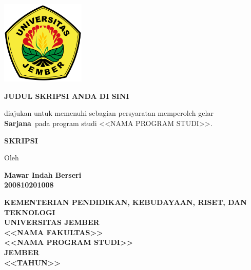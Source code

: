 \documentclass[12pt, a4paper, onecolumn, oneside]{report}
\newcommand{\thetitle}{JUDUL SKRIPSI ANDA DI SINI} %
\newcommand{\theauthor}{Mawar Indah Berseri} %
\newcommand{\thenim}{200810201008} %
\newcommand{\thedegree}{\textbf{Sarjana}} %
\newcommand{\thestudyprogram}{\textless\textless NAMA PROGRAM STUDI\textgreater\textgreater} %
\newcommand{\thetypeofreport}{SKRIPSI} %
\newcommand{\thefaculty}{\textless\textless NAMA FAKULTAS\textgreater\textgreater} %
\newcommand{\theyear}{\textless\textless TAHUN\textgreater\textgreater} %
\begin{document}
\begin{titlepage}
    \centering
    \vspace*{2cm} %

    \includegraphics[width=0.3\textwidth]{resources/images/logo_unej.png}\par %
    \vspace{1cm}

    {\bfseries\fontsize{14pt}{16pt}\selectfont \MakeUppercase{\thetitle}} %
    \vspace{1.5cm}

    diajukan untuk memenuhi sebagian persyaratan memperoleh gelar \\\thedegree\ pada program studi \thestudyprogram. %
    \vspace{1cm}

    \textbf{\MakeUppercase{\thetypeofreport}} %
    \vspace{1.5cm}

    Oleh \par %
    \vspace{0.5cm}

    \textbf{\theauthor} \\ %
    \textbf{\thenim} \par %
    \vspace{2cm} %

    \textbf{KEMENTERIAN PENDIDIKAN, KEBUDAYAAN, RISET, DAN TEKNOLOGI} \\
    \textbf{UNIVERSITAS JEMBER} \\
    \textbf{\MakeUppercase{\thefaculty}} \\ 
    \textbf{\MakeUppercase{\thestudyprogram}} \\ 
    \textbf{JEMBER} \\
    \textbf{\theyear} %
\end{titlepage}
\end{document}
